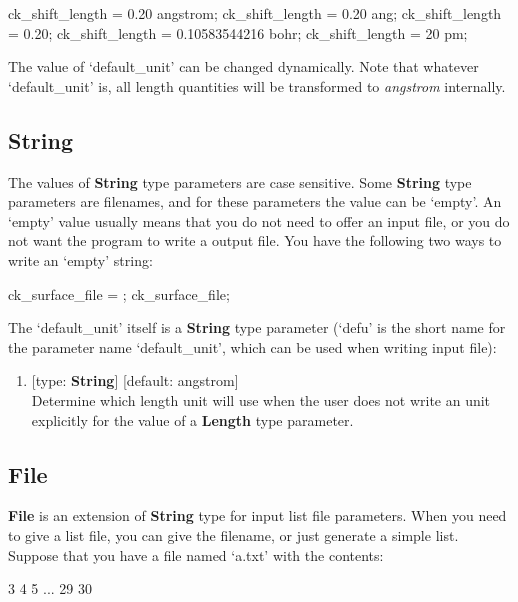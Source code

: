 \documentclass[11pt]{book}
\begin{document}
\begin{everbatim}
ck_shift_length = 0.20 angstrom;
ck_shift_length = 0.20 ang;
ck_shift_length = 0.20;
ck_shift_length = 0.10583544216 bohr;
ck_shift_length = 20 pm;
\end{everbatim}

The value of `default\_unit' can be changed dynamically. Note that whatever `default\_unit' is, all length quantities will be 
transformed to \emph{angstrom} internally.

\subsection{String}

The values of \textbf{String} type parameters are case sensitive. Some \textbf{String} type parameters are filenames, 
and for these parameters the value can be `empty'. An `empty' value usually means that you do not need to offer an input file, 
or you do not want the program to write a output file. You have the following two ways to write an `empty' string:

\begin{everbatim}
ck_surface_file = ;
ck_surface_file;
\end{everbatim}

The `default\_unit' itself is a \textbf{String} type parameter (`defu' is the short name for the parameter name `default\_unit', 
which can be used when writing input file):

\begin{enumerate}
\item {} [type: \textbf{String}] [default: angstrom] \\
	Determine which length unit will use when the user does not write an unit explicitly for the value 
	of a \textbf{Length} type parameter.
\end{enumerate}

\subsection{File} \label{seq}

\textbf{File} is an extension of \textbf{String} type for input list file parameters. When you need to give a list file, 
you can give the filename, or just generate a simple list. Suppose that you have a file named `a.txt' with the contents:

\begin{everbatim}
3
4
5
...
29
30
\end{everbatim}
\end{document}
